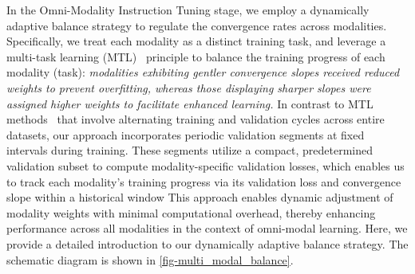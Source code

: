 In the Omni-Modality Instruction Tuning stage, we employ a dynamically adaptive balance strategy to regulate the convergence rates across modalities. Specifically, we treat each modality as a distinct training task, and leverage a multi-task learning (MTL)~\cite{crawshaw2020multi, liu2019loss} principle to balance the training progress of each modality (task): \textit{modalities exhibiting gentler convergence slopes received reduced weights to prevent overfitting, whereas those displaying sharper slopes were assigned higher weights to facilitate enhanced learning.}  In contrast to MTL methods~\cite{liu2024mftcoder, gong2024coba} that involve alternating training and validation cycles across entire datasets, our approach incorporates periodic validation segments at fixed intervals during training. These segments utilize a compact, predetermined validation subset to compute modality-specific validation losses, which enables us to track each modality's training progress via its validation loss and convergence slope within a historical window
This approach enables dynamic adjustment of modality weights with minimal computational overhead, thereby enhancing performance across all modalities in the context of omni-modal learning. Here, we provide a detailed introduction to our dynamically adaptive balance strategy.
The schematic diagram is shown in \cref{fig-multi_modal_balance}.


